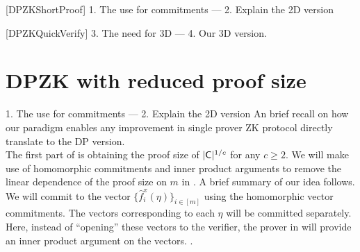 [DPZKShortProof]
1. The use for commitments --- 2. Explain the 2D version  

[DPZKQuickVerify]
3. The need for 3D --- 4. Our 3D version.


\section{DPZK with reduced proof size}
1. The use for commitments --- 2. Explain the 2D version  
An brief recall on how our paradigm enables any improvement in single prover ZK protocol directly translate to the DP version.\\

The first part of \name{} is obtaining the proof size of $|\mathsf{C}|^{1/c}$ for any $c \geq 2$.
We will make use of homomorphic commitments and inner product arguments to remove the linear dependence of the proof size on $m$ in \cite{Ligero2017}. A brief summary of our idea follows. We will commit to the vector $\{\hat{f}^x_i(\eta)\}_{i \in [m]}$ using the homomorphic vector commitments. The vectors corresponding to each $\eta$ will be committed separately. Here, instead of ``opening'' these vectors to the verifier, the prover in \name{} will provide an inner product argument on the vectors.
.

